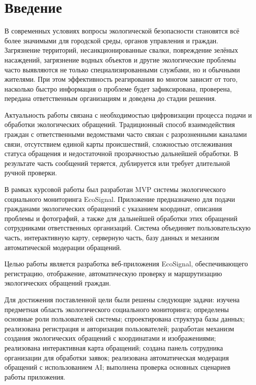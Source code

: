 \documentclass[14pt,a4paper]{extarticle}
\begin{document}
\newpage
\tableofcontents
\newpage

\section*{Введение}

В современных условиях вопросы экологической безопасности становятся всё более значимыми для городской среды, органов управления и граждан. Загрязнение территорий, несанкционированные свалки, повреждение зелёных насаждений, загрязнение водных объектов и другие экологические проблемы часто выявляются не только специализированными службами, но и обычными жителями. При этом эффективность реагирования во многом зависит от того, насколько быстро информация о проблеме будет зафиксирована, проверена, передана ответственным организациям и доведена до стадии решения.

Актуальность работы связана с необходимостью цифровизации процесса подачи и обработки экологических обращений. Традиционный способ взаимодействия граждан с ответственными ведомствами часто связан с разрозненными каналами связи, отсутствием единой карты происшествий, сложностью отслеживания статуса обращения и недостаточной прозрачностью дальнейшей обработки. В результате часть сообщений теряется, дублируется или требует длительной ручной проверки.

В рамках курсовой работы был разработан MVP системы экологического социального мониторинга EcoSignal. Приложение предназначено для подачи гражданами экологических обращений с указанием координат, описания проблемы и фотографий, а также для дальнейшей обработки этих обращений сотрудниками ответственных организаций. Система объединяет пользовательскую часть, интерактивную карту, серверную часть, базу данных и механизм автоматической модерации обращений.

Целью работы является разработка веб-приложения EcoSignal, обеспечивающего регистрацию, отображение, автоматическую проверку и маршрутизацию экологических обращений граждан.

Для достижения поставленной цели были решены следующие задачи: изучена предметная область экологического социального мониторинга; определены основные роли пользователей системы; спроектирована структура базы данных; реализована регистрация и авторизация пользователей; разработан механизм создания экологических обращений с координатами и изображениями; реализована интерактивная карта обращений; создана панель сотрудника организации для обработки заявок; реализована автоматическая модерация обращений с использованием AI; выполнена проверка основных сценариев работы приложения.
\end{document}
